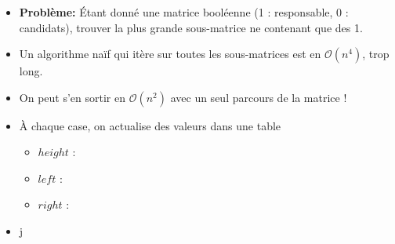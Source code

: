 \begin{frame}
    \frametitle{\problemtitle}
    \begin{itemize}
        \item<+-> \textbf{Problème:} Étant donné une matrice booléenne (1 : responsable, 0 : candidats), trouver la plus grande sous-matrice ne contenant que des 1.
        \item<+-> Un algorithme naïf qui itère sur toutes les sous-matrices est en $\mathcal{O}(n^4)$, trop long.
        \item<+-> On peut s'en sortir en $\mathcal{O}(n^2)$ avec un seul parcours de la matrice !
        \item<+-> À chaque case, on actualise des valeurs dans une table
                  \begin{itemize}
                     \item $height$ :
                     \item $left$ :
                     \item $right$ :
                  \end{itemize}
        \item<+-> j
    \end{itemize}
\end{frame}
